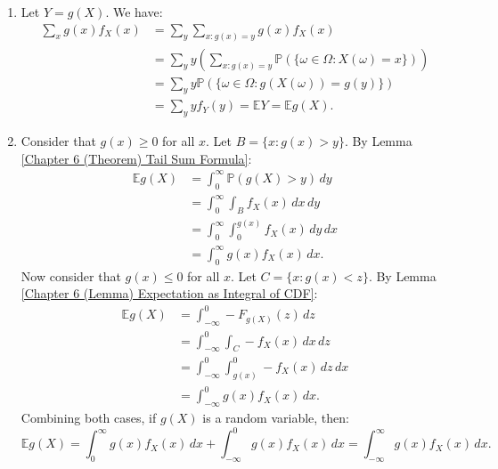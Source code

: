 \documentclass{huhtakm-template-book-v2}
\newcommand{\prob}{\mathbb{P}}
\newcommand{\expect}{\mathbb{E}}
\begin{document}
    \begin{proofing}
        \begin{enumerate}
            \item Let $Y = g(X)$. We have:
            \begin{align*}
                \sum_{x}g(x)f_{X}(x) &= \sum_{y}\sum_{x:g(x) = y}g(x)f_{X}(x)\\
                &= \sum_{y}y\left(\sum_{x:g(x) = y}\prob(\{\omega \in \Omega:X(\omega) = x\})\right)\\
                &= \sum_{y}y\prob(\{\omega \in \Omega:g(X(\omega)) = g(y)\})\\
                &= \sum_{y}yf_{Y}(y) = \expect{Y} = \expect{g(X)}.
            \end{align*}
            \item Consider that $g(x) \geq 0$ for all $x$. Let $B = \{x:g(x) > y\}$. By Lemma \ref{Chapter 6 (Theorem) Tail Sum Formula}:
            \begin{align*}
                \expect{g(X)} &= \int_{0}^{\infty}\prob(g(X) > y)\,dy\\
                &= \int_{0}^{\infty}\int_{B}f_{X}(x)\,dx\,dy\\
                &= \int_{0}^{\infty}\int_{0}^{g(x)}f_{X}(x)\,dy\,dx\\
                &= \int_{0}^{\infty}g(x)f_{X}(x)\,dx.
            \end{align*}
            Now consider that $g(x) \leq 0$ for all $x$. Let $C = \{x:g(x) < z\}$. By Lemma \ref{Chapter 6 (Lemma) Expectation as Integral of CDF}:
            \begin{align*}
                \expect{g(X)} &= \int_{-\infty}^{0}-F_{g(X)}(z)\,dz\\
                &= \int_{-\infty}^{0}\int_{C}-f_{X}(x)\,dx\,dz\\
                &= \int_{-\infty}^{0}\int_{g(x)}^{0}-f_{X}(x)\,dz\,dx\\
                &= \int_{-\infty}^{0}g(x)f_{X}(x)\,dx.
            \end{align*}
            Combining both cases, if $g(X)$ is a random variable, then:
            \begin{equation*}
                \expect{g(X)} = \int_{0}^{\infty}g(x)f_{X}(x)\,dx+\int_{-\infty}^{0}g(x)f_{X}(x)\,dx = \int_{-\infty}^{\infty} g(x)f_{X}(x)\,dx.
            \end{equation*}
        \end{enumerate}
    \end{proofing}
    \newpage
\end{document}
